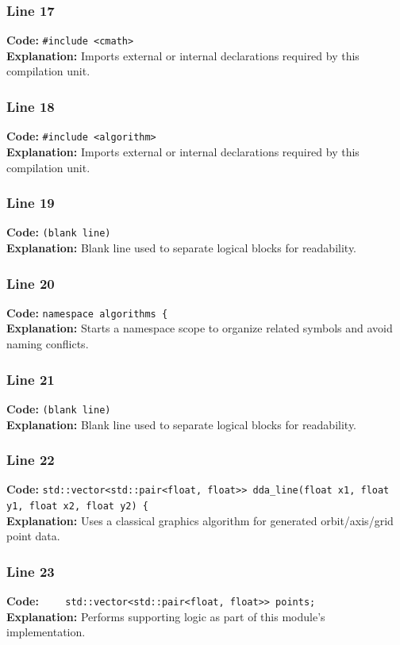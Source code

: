 \documentclass[11pt,a4paper]{article}
\begin{document}
\subsubsection*{Line 17}
\textbf{Code:} \verb|#include <cmath>|\\
\textbf{Explanation:} Imports external or internal declarations required by this compilation unit.

\subsubsection*{Line 18}
\textbf{Code:} \verb|#include <algorithm>|\\
\textbf{Explanation:} Imports external or internal declarations required by this compilation unit.

\subsubsection*{Line 19}
\textbf{Code:} \texttt{(blank line)}\\
\textbf{Explanation:} Blank line used to separate logical blocks for readability.

\subsubsection*{Line 20}
\textbf{Code:} \verb|namespace algorithms {|\\
\textbf{Explanation:} Starts a namespace scope to organize related symbols and avoid naming conflicts.

\subsubsection*{Line 21}
\textbf{Code:} \texttt{(blank line)}\\
\textbf{Explanation:} Blank line used to separate logical blocks for readability.

\subsubsection*{Line 22}
\textbf{Code:} \verb|std::vector<std::pair<float, float>> dda_line(float x1, float y1, float x2, float y2) {|\\
\textbf{Explanation:} Uses a classical graphics algorithm for generated orbit/axis/grid point data.

\subsubsection*{Line 23}
\textbf{Code:} \verb|    std::vector<std::pair<float, float>> points;|\\
\textbf{Explanation:} Performs supporting logic as part of this module's implementation.
\end{document}
